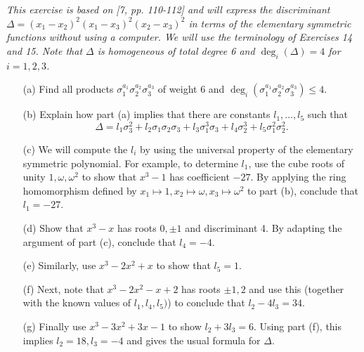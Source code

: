 \documentclass[11pt,a4paper]{article}
\begin{document}
{\it This exercise is based on [7, pp. 110-112] and will express the discriminant $\Delta = (x_1-x_2)^2(x_1-x_3)^2(x_2-x_3)^2$ in terms of the elementary symmetric functions without using a computer. We will use the terminology of Exercises 14 and 15. Note that $\Delta$ is homogeneous of total degree 6 and $\deg_i(\Delta) = 4$ for $i=1,2,3$.
\begin{enumerate}
\item[(a)] Find all products $\sigma_1^{a_1}\sigma_2^{a_2}\sigma_3^{a_3}$ of weight 6 and $\deg_i(\sigma_1^{a_1} \sigma_2^{a_2}\sigma_3^{a_3}) \leq 4$.
\item[(b)] Explain how part (a) implies that there are constants $l_1,\ldots,l_5$ such that
$$\Delta = l_1\sigma_3^2+l_2\sigma_1\sigma_2\sigma_3+l_3\sigma_1^3\sigma_3+l_4\sigma_2^3+l_5\sigma_1^2\sigma_2^2.$$
\item[(c)] We will compute the $l_i$ by using the universal property of the elementary symmetric polynomial. For example, to determine $l_1$, use the cube roots of unity $1,\omega,\omega^2$ to show that $x^3-1$ has coefficient $-27$. By applying the ring homomorphism defined by $x_1\mapsto 1,x_2\mapsto\omega,x_3\mapsto\omega^2$ to part (b), conclude that $l_1 = -27$.
\item[(d)] Show that $x^3-x$ has roots $0,\pm1$ and discriminant 4. By adapting the argument of part (c), conclude that $l_4 = -4$.
\item[(e)] Similarly, use $x^3-2x^2+x$ to show that $l_5 = 1$.
\item[(f)] Next, note that $x^3-2x^2-x+2$ has roots $\pm1,2$ and use this (together with the known values of $l_1,l_4,l_5)$) to conclude that $l_2-4l_3 = 34$.
\item[(g)] Finally use $x^3-3x^2+3x-1$ to show $l_2+3l_3 = 6$. Using part (f), this implies $l_2 = 18,l_3 = -4$ and gives the usual formula for $\Delta$.

\end{enumerate}
}
\end{document}
